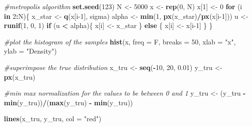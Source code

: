 \documentclass[
]{article}
\newenvironment{Shaded}{\begin{snugshade}}{\end{snugshade}}
\newcommand{\AttributeTok}[1]{\textcolor[rgb]{0.13,0.29,0.53}{#1}}
\newcommand{\CommentTok}[1]{\textcolor[rgb]{0.56,0.35,0.01}{\textit{#1}}}
\newcommand{\ControlFlowTok}[1]{\textcolor[rgb]{0.13,0.29,0.53}{\textbf{#1}}}
\newcommand{\DecValTok}[1]{\textcolor[rgb]{0.00,0.00,0.81}{#1}}
\newcommand{\FloatTok}[1]{\textcolor[rgb]{0.00,0.00,0.81}{#1}}
\newcommand{\FunctionTok}[1]{\textcolor[rgb]{0.13,0.29,0.53}{\textbf{#1}}}
\newcommand{\NormalTok}[1]{#1}
\newcommand{\OtherTok}[1]{\textcolor[rgb]{0.56,0.35,0.01}{#1}}
\newcommand{\SpecialCharTok}[1]{\textcolor[rgb]{0.81,0.36,0.00}{\textbf{#1}}}
\newcommand{\StringTok}[1]{\textcolor[rgb]{0.31,0.60,0.02}{#1}}
\begin{document}
\begin{Shaded}
\begin{Highlighting}[]
\CommentTok{\#metropolis algorithm}
\FunctionTok{set.seed}\NormalTok{(}\DecValTok{123}\NormalTok{)}
\NormalTok{N }\OtherTok{\textless{}{-}} \DecValTok{5000}
\NormalTok{x }\OtherTok{\textless{}{-}} \FunctionTok{rep}\NormalTok{(}\DecValTok{0}\NormalTok{, N)}
\NormalTok{x[}\DecValTok{1}\NormalTok{] }\OtherTok{\textless{}{-}} \DecValTok{0}
\ControlFlowTok{for}\NormalTok{ (i }\ControlFlowTok{in} \DecValTok{2}\SpecialCharTok{:}\NormalTok{N)\{}
\NormalTok{  x\_star }\OtherTok{\textless{}{-}} \FunctionTok{q}\NormalTok{(x[i}\DecValTok{{-}1}\NormalTok{], sigma)}
\NormalTok{  alpha }\OtherTok{\textless{}{-}} \FunctionTok{min}\NormalTok{(}\DecValTok{1}\NormalTok{, }\FunctionTok{px}\NormalTok{(x\_star)}\SpecialCharTok{/}\FunctionTok{px}\NormalTok{(x[i}\DecValTok{{-}1}\NormalTok{]))}
\NormalTok{  u }\OtherTok{\textless{}{-}} \FunctionTok{runif}\NormalTok{(}\DecValTok{1}\NormalTok{, }\DecValTok{0}\NormalTok{, }\DecValTok{1}\NormalTok{)}
  \ControlFlowTok{if}\NormalTok{ (u }\SpecialCharTok{\textless{}}\NormalTok{ alpha)\{}
\NormalTok{    x[i] }\OtherTok{\textless{}{-}}\NormalTok{ x\_star}
\NormalTok{  \} }\ControlFlowTok{else}\NormalTok{ \{}
\NormalTok{    x[i] }\OtherTok{\textless{}{-}}\NormalTok{ x[i}\DecValTok{{-}1}\NormalTok{]}
\NormalTok{  \}}
\NormalTok{\}}
\end{Highlighting}
\end{Shaded}

\begin{Shaded}
\begin{Highlighting}[]
\CommentTok{\#plot the histogram of the samples}
\FunctionTok{hist}\NormalTok{(x, }\AttributeTok{freq =}\NormalTok{ F, }\AttributeTok{breaks =} \DecValTok{50}\NormalTok{, }\AttributeTok{xlab =} \StringTok{"x"}\NormalTok{, }\AttributeTok{ylab =} \StringTok{"Density"}\NormalTok{)}


\CommentTok{\#superimpose the true distribution}
\NormalTok{x\_tru }\OtherTok{\textless{}{-}} \FunctionTok{seq}\NormalTok{(}\SpecialCharTok{{-}}\DecValTok{10}\NormalTok{, }\DecValTok{20}\NormalTok{, }\FloatTok{0.01}\NormalTok{)}
\NormalTok{y\_tru }\OtherTok{\textless{}{-}} \FunctionTok{px}\NormalTok{(x\_tru)}

\CommentTok{\#min max normalization for the values to be between 0 and 1}
\NormalTok{y\_tru }\OtherTok{\textless{}{-}}\NormalTok{ (y\_tru }\SpecialCharTok{{-}} \FunctionTok{min}\NormalTok{(y\_tru))}\SpecialCharTok{/}\NormalTok{(}\FunctionTok{max}\NormalTok{(y\_tru) }\SpecialCharTok{{-}} \FunctionTok{min}\NormalTok{(y\_tru))}

\FunctionTok{lines}\NormalTok{(x\_tru, y\_tru, }\AttributeTok{col =} \StringTok{"red"}\NormalTok{)}
\end{Highlighting}
\end{Shaded}
\end{document}
